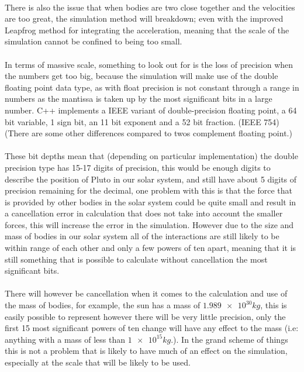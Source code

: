 \paragraph{}
There is also the issue that when bodies are two close together and the velocities are too great, the simulation method will breakdown; even with the improved Leapfrog method for integrating the acceleration, meaning that the scale of the simulation cannot be confined to being too small.

\paragraph{}
In terms of massive scale, something to look out for is the loss of precision when the numbers get too big, because the simulation will make use of the double floating point data type, as with float precision is not constant through a range in numbers as the mantissa is taken up by the most significant bits in a large number. C++ implements a IEEE variant of double-precision floating point, a 64 bit variable, 1 sign bit, an 11 bit exponent and a 52 bit fraction. (IEEE 754) (There are some other differences compared to twos complement floating point.)

\paragraph{}
These bit depths mean that (depending on particular implementation) the double precision type has 15-17 digits of precision, this would be enough digits to describe the position of Pluto in our solar system, and still have about 5 digits of precision remaining for the decimal, one problem with this is that the force that is provided by other bodies in the solar system could be quite small and result in a cancellation error in calculation that does not take into account the smaller forces, this will increase the error in the simulation. However due to the size and mass of bodies in our solar system all of the interactions are still likely to be within range of each other and only a few powers of ten apart, meaning that it is still something that is possible to calculate without cancellation the most significant bits.

\paragraph{}
There will however be cancellation when it comes to the calculation and use of the mass of bodies, for example, the sun has a mass of $\num{1.989e30} kg$, this is easily possible to represent however there will be very little precision, only the first 15 most significant powers of ten change will have any effect to the mass (i.e: anything with a mass of less than $\num{1e15} kg$.). In the grand scheme of things this is not a problem that is likely to have much of an effect on the simulation, especially at the scale that will be likely to be used.

